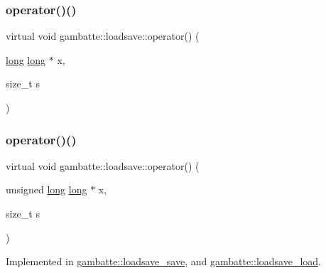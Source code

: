 \subsubsection{\texorpdfstring{operator()()}{operator()()}\hspace{0.1cm}{\footnotesize\ttfamily [16/19]}}
{\footnotesize\ttfamily virtual void gambatte\+::loadsave\+::operator() (\begin{DoxyParamCaption}\item[{\hyperlink{ioapi_8h_a3c7b35ad9dab18b8310343c201f7b27e}{long} \hyperlink{ioapi_8h_a3c7b35ad9dab18b8310343c201f7b27e}{long} $\ast$}]{x,  }\item[{size\+\_\+t}]{s }\end{DoxyParamCaption})\hspace{0.3cm}{\ttfamily [pure virtual]}}

\mbox{\label{classgambatte_1_1loadsave_a93ef67515dbf61461e7370c9cc77c8a6}} 
\subsubsection{\texorpdfstring{operator()()}{operator()()}\hspace{0.1cm}{\footnotesize\ttfamily [17/19]}}
{\footnotesize\ttfamily virtual void gambatte\+::loadsave\+::operator() (\begin{DoxyParamCaption}\item[{unsigned \hyperlink{ioapi_8h_a3c7b35ad9dab18b8310343c201f7b27e}{long} \hyperlink{ioapi_8h_a3c7b35ad9dab18b8310343c201f7b27e}{long} $\ast$}]{x,  }\item[{size\+\_\+t}]{s }\end{DoxyParamCaption})\hspace{0.3cm}{\ttfamily [pure virtual]}}



Implemented in \hyperlink{classgambatte_1_1loadsave__save_a54522867610dbbbb57932a862914646b}{gambatte\+::loadsave\+\_\+save}, and \hyperlink{classgambatte_1_1loadsave__load_a3ac6797ca2311f63b2f4ec080de5f1d9}{gambatte\+::loadsave\+\_\+load}.

\mbox{\label{classgambatte_1_1loadsave_a911a5ce78fbb8c4ceb36984a9967ea72}} 
